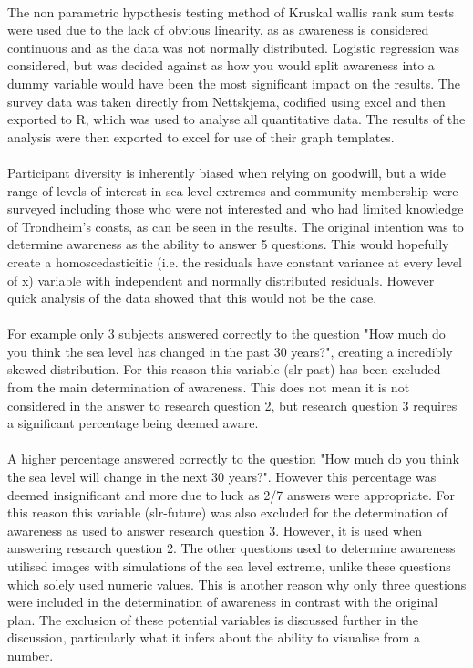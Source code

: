 \paragraph{}
The non parametric hypothesis testing method of Kruskal wallis rank sum tests were used due to the lack of obvious linearity, as as awareness is considered continuous and as the data was not normally distributed. Logistic regression was considered, but was decided against as how you would split awareness into a dummy variable would have been the most significant impact on the results. The survey data was taken directly from Nettskjema, codified using excel and then exported to R, which was used to analyse all quantitative data. The results of the analysis were then exported to excel for use of their graph templates.
\paragraph{}
Participant diversity is inherently biased when relying on goodwill, but a wide range of levels of interest in sea level extremes and community membership were surveyed including those who were not interested and who had limited knowledge of Trondheim’s coasts, as can be seen in the results. The original intention was to determine awareness as the ability to answer 5 questions. This would hopefully create a homoscedasticitic (i.e. the residuals have constant variance at every level of x) variable with independent and normally distributed residuals. However quick analysis of the data showed that this would not be the case.
\paragraph{}
  For example only 3 subjects answered correctly to the question "How much do you think the sea level has changed in the past 30 years?", creating a incredibly skewed distribution. For this reason this variable (slr-past) has been excluded from the main determination of awareness. This does not mean it is not considered in the answer to research question 2, but research question 3 requires a significant percentage being deemed aware. 
\paragraph{}
  A higher percentage answered correctly to the question "How much do you think the sea level will change in the next 30 years?". However this percentage was deemed insignificant and more due to luck as 2/7 answers were appropriate. For this reason this variable (slr-future) was also excluded for the determination of awareness as used to answer research question 3. However, it is used when answering research question 2. The other questions used to determine awareness utilised images with simulations of the sea level extreme, unlike these questions which solely used numeric values. This is another reason why only three questions were included in the determination of awareness in contrast with the original plan. The exclusion of these potential variables is discussed further in the discussion, particularly what it infers about the ability to visualise from a number. 
